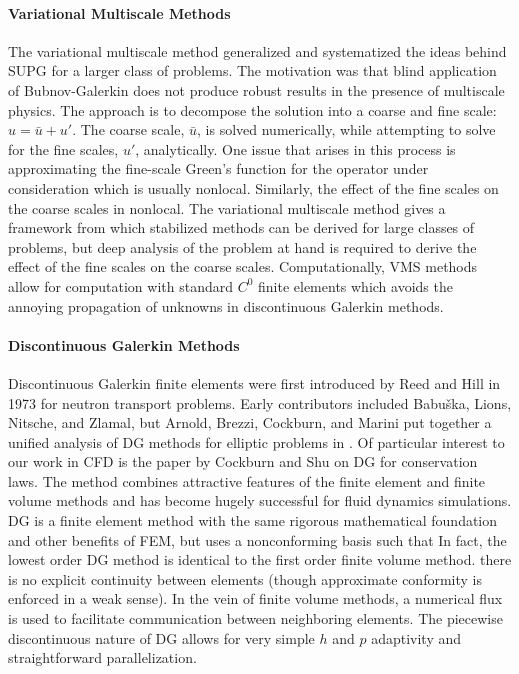 \documentclass[Proposal.tex]{subfiles}
\begin{document}
\paragraph{Variational Multiscale Methods}
The variational multiscale method generalized and systematized the ideas behind SUPG for a larger class of problems.
The motivation was that blind application of Bubnov-Galerkin does not produce robust results in the presence of multiscale physics\cite{VMS}.
The approach is to decompose the solution into a coarse and fine scale: $u=\bar u+u'$. The coarse scale, $\bar u$, is solved numerically,
while attempting to solve for the fine scales, $u'$, analytically.
One issue that arises in this process is approximating the fine-scale Green's function for the operator under consideration which is usually nonlocal.
Similarly, the effect of the fine scales on the coarse scales in nonlocal.
The variational multiscale method gives a framework from which stabilized methods can be derived for large classes of problems,
but deep analysis of the problem at hand is required to derive the effect of the fine scales on the coarse scales.
Computationally, VMS methods allow for computation with standard $C^0$ finite elements which avoids the annoying propagation of unknowns in
discontinuous Galerkin methods.

\paragraph{Discontinuous Galerkin Methods}
Discontinuous Galerkin finite elements were first introduced by Reed and Hill in 1973 for neutron transport problems\cite{ReedHillDG}.
Early contributors included Babu\v{s}ka, Lions, Nitsche, and Zlamal, but Arnold, Brezzi, Cockburn, and Marini put together a unified analysis
of DG methods for elliptic problems in \cite{ArnoldDG}. 
Of particular interest to our work in CFD is the paper by Cockburn and Shu\cite{CockburnShuDG} on DG for conservation laws.
The method combines attractive features of the finite element and finite volume methods and has become hugely successful for fluid dynamics simulations.
DG is a finite element method with the same rigorous mathematical foundation and other benefits of FEM, but uses a nonconforming basis such that
In fact, the lowest order DG method is identical to the first order finite volume method.
there is no explicit continuity between elements (though approximate conformity is enforced in a weak sense). 
In the vein of finite volume methods, a numerical flux is used to facilitate communication between neighboring elements.
The piecewise discontinuous nature of DG allows for very simple $h$ and $p$ adaptivity and straightforward parallelization.
\end{document}
